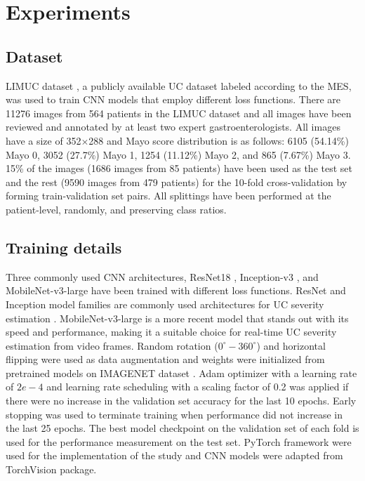 \documentclass[runningheads]{llncs}
\begin{document}
\section{Experiments}

\subsection{Dataset}

LIMUC dataset \cite{gorkem_polat_2022_5827695}, a publicly available UC dataset labeled according to the MES, was used to train CNN models that employ different loss functions. There are 11276 images from 564 patients in the LIMUC dataset and all images have been reviewed and annotated by at least two expert gastroenterologists. All images have a size of 352$\times$288 and Mayo score distribution is as follows: 6105 (54.14\%) Mayo 0, 3052 (27.7\%) Mayo 1, 1254 (11.12\%) Mayo 2, and 865 (7.67\%) Mayo 3. 15\% of the images (1686 images from 85 patients) have been used as the test set and the rest (9590 images from 479 patients) for the 10-fold cross-validation by forming train-validation set pairs. All splittings have been performed at the patient-level, randomly, and preserving class ratios. 

\subsection{Training details}
Three commonly used CNN architectures, ResNet18 \cite{he2016deep}, Inception-v3 \cite{szegedy2016rethinking}, and MobileNet-v3-large \cite{howard2019searching} have been trained with different loss functions. ResNet and Inception model families are commonly used architectures for UC severity estimation \cite{stidham2019performance,ozawa2019novel,takenaka2020development,bhambhvani2021deep,gutierrez2021training,schwab2021automatic,yao2021fully}. MobileNet-v3-large is a more recent model that stands out with its speed and performance, making it a suitable choice for real-time UC severity estimation from video frames. Random rotation ($0^{\circ}-360^{\circ}$) and horizontal flipping were used as data augmentation and weights were initialized from pretrained models on IMAGENET dataset \cite{russakovsky2015imagenet}. Adam optimizer with a learning rate of $2e-4$ and learning rate scheduling with a scaling factor of 0.2 was applied if there were no increase in the validation set accuracy for the last 10 epochs. Early stopping was used to terminate training when performance did not increase in the last 25 epochs. The best model checkpoint on the validation set of each fold is used for the performance measurement on the test set. PyTorch framework \cite{paszke2019pytorch} were used for the implementation of the study and CNN models were adapted from TorchVision package.
\end{document}

